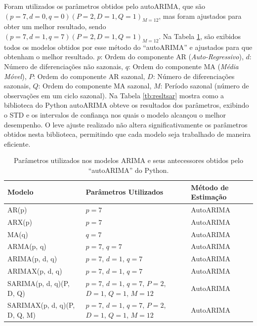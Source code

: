 Foram utilizados os parâmetros obtidos pelo autoARIMA, que são $(p = 7, d = 0, q = 0) (P = 2, D = 1, Q = 1)_{M = 12}$, mas foram ajustados para obter um melhor resultado, sendo $(p = 7, d = 1, q = 7) (P = 2, D = 1, Q = 1)_{M = 12}$. Na Tabela \ref{tab:autoarima_params}, são exibidos todos os modelos obtidos por esse método do ``autoARIMA'' e ajustados para que obtenham o melhor resultado.
\(p\): Ordem do componente AR (\textit{Auto-Regressivo}),
\(d\): Número de diferenciações não sazonais,
\(q\): Ordem do componente MA (\textit{Média Móvel}),
\(P\): Ordem do componente AR sazonal,
\(D\): Número de diferenciações sazonais,
\(Q\): Ordem do componente MA sazonal,
\(M\): Período sazonal (número de observações em um ciclo sazonal).
Na Tabela \ref{tb:resltsar} mostra como a biblioteca do Python autoARIMA obteve os resultados dos parâmetros, exibindo o STD e os intervalos de confiança nos quais o modelo alcançou o melhor desempenho. O leve ajuste realizado não altera significativamente os parâmetros obtidos nesta biblioteca, permitindo que cada modelo seja trabalhado de maneira eficiente.

\begin{table}[!htb]
	\centering
	\caption{Parâmetros utilizados nos modelos ARIMA e seus antecessores obtidos pelo ``autoARIMA'' do Python.}
	\label{tab:autoarima_params}
	\small
	\begin{tabular}{
			>{\centering\arraybackslash}p{5.5cm}
			>{\centering\arraybackslash}p{6cm}
			>{\centering\arraybackslash}p{3cm}
		}
		\toprule
		\textbf{Modelo} & \textbf{Parâmetros Utilizados} & \textbf{Método de Estimação} \\
		\midrule
		AR(p) & \( p = 7 \) & AutoARIMA \\
		ARX(p) & \( p = 7 \) & AutoARIMA \\
		MA(q) & \( q = 7 \) & AutoARIMA  \\
		ARMA(p, q) & \( p = 7 \), \( q = 7 \) & AutoARIMA  \\
		ARIMA(p, d, q) & \( p = 7 \), \( d = 1 \), \( q = 7 \) & AutoARIMA  \\
		ARIMAX(p, d, q) & \( p = 7 \), \( d = 1 \), \( q = 7 \) & AutoARIMA  \\
		SARIMA(p, d, q)(P, D, Q) & \( p = 7 \), \( d = 1 \), \( q = 7 \), \( P = 2 \), \( D = 1 \), \( Q = 1 \), \( M = 12 \) & AutoARIMA  \\
		SARIMAX(p, d, q)(P, D, Q, M) & \( p = 7 \), \( d = 1 \), \( q = 7 \), \( P = 2 \), \( D = 1 \), \( Q = 1 \), \( M = 12 \) & AutoARIMA  \\
		\bottomrule
	\end{tabular}
\end{table}



